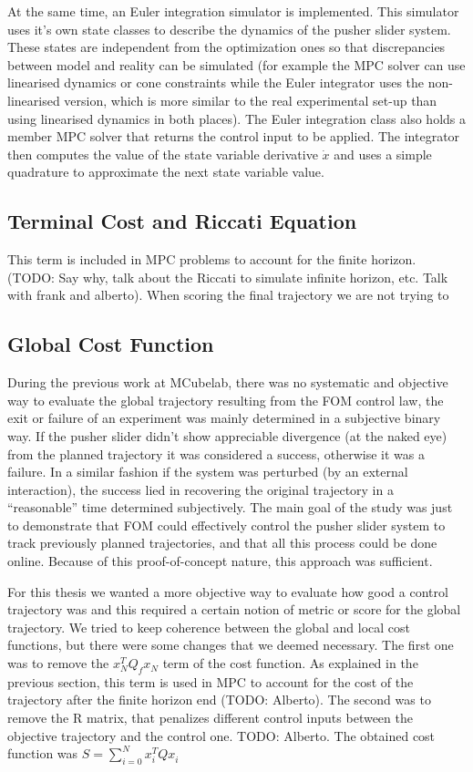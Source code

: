 \documentclass[12,twoside]{TFG-GM}
\theoremstyle{definition}
\theoremstyle{remark}
\begin{document}
At the same time, an Euler integration simulator is implemented. This simulator uses it's own state classes to describe the dynamics of the pusher slider system. These states are independent from the optimization ones so that discrepancies between model and reality can be simulated (for example the MPC solver can use linearised dynamics or cone constraints while the Euler integrator uses the non-linearised version, which is more similar to the real experimental set-up than using linearised dynamics in both places). The Euler integration class also holds a member MPC solver that returns the control input to be applied. The integrator then computes the value of the state variable derivative $\dot{x}$ and uses a simple quadrature to approximate the next state variable value.

\subsection{Terminal Cost and Riccati Equation}
This term is included in MPC problems to account for the finite horizon. (TODO: Say why, talk about the Riccati to simulate infinite horizon, etc. Talk with frank and alberto). When scoring the final trajectory we are not trying to

\subsection{Global Cost Function}
\label{subsec:costfunc}
During the previous work at MCubelab, there was no systematic and objective way to evaluate the global trajectory resulting from the FOM control law, the exit or failure of an experiment was mainly determined in a subjective binary way. If the pusher slider didn’t show appreciable divergence (at the naked eye) from the planned trajectory it was considered a success, otherwise it was a failure. In a similar fashion if the system was perturbed (by an external interaction), the success lied in recovering the original trajectory in a “reasonable” time determined subjectively. The main goal of the study was just to demonstrate that FOM could effectively control the pusher slider system to track previously planned trajectories, and that all this process could be done online. Because of this proof-of-concept nature, this approach was sufficient.

For this thesis we wanted a more objective way to evaluate how good a control trajectory was and this required a certain notion of metric or score for the global trajectory. We tried to keep coherence between the global and local cost functions, but there were some changes that we deemed necessary. The first one was to remove the $x_N^T Q_{f}^{} x_N^{}$ term of the cost function. As explained in the previous section, this term is used in MPC to account for the cost of the trajectory after the finite horizon end (TODO: Alberto). The second was to remove the R matrix, that penalizes different control inputs between the objective trajectory and the control one. TODO: Alberto. The obtained cost function was $S = \sum\limits_{i = 0}^{N}{x_{i}^{T} Q x_i^{}}$
\end{document}
